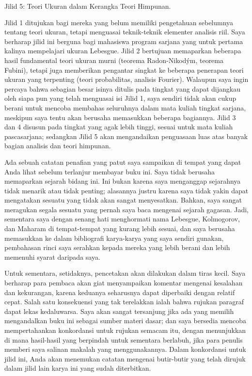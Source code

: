 \qquad\qquad Jilid 5:  Teori Ukuran dalam Kerangka Teori Himpunan.

\medskip

\noindent Jilid 1 ditujukan bagi mereka yang belum memiliki pengetahuan
sebelumnya tentang teori ukuran, tetapi menguasai teknik-teknik elementer
analisis riil.  Saya berharap jilid ini berguna bagi mahasiswa program sarjana
yang untuk pertama kalinya mempelajari ukuran Lebesgue.    Jilid 2 bertujuan
memaparkan beberapa hasil fundamental teori ukuran murni (teorema
Radon-Nikod\'ym, teorema Fubini), tetapi juga memberikan pengantar singkat
ke beberapa penerapan teori ukuran yang terpenting (teori probabilitas,
analisis Fourier).   Walaupun saya ingin percaya bahwa sebagian besar isinya
ditulis pada tingkat yang dapat dijangkau oleh siapa pun yang telah menguasai
isi Jilid 1, saya sendiri tidak akan cukup berani untuk mencoba membahas
seluruhnya dalam mata kuliah tingkat sarjana, meskipun saya tentu akan
berusaha memasukkan beberapa bagiannya.   Jilid 3 dan 4 disusun pada tingkat
yang agak lebih tinggi, sesuai untuk mata kuliah pascasarjana;  sedangkan
Jilid 5 akan mengandaikan penguasaan luas atas banyak bagian analisis dan
teori himpunan.

Ada sebuah catatan penafian yang patut saya sampaikan di tempat yang dapat
Anda lihat sebelum terlanjur membayar buku ini.   Saya tidak berusaha
memaparkan sejarah bidang ini.   Ini bukan karena saya menganggap sejarahnya
tidak menarik atau tidak penting;  alasannya justru karena saya tidak yakin
dapat mengatakan sesuatu yang tidak akan sangat menyesatkan.
Bahkan, saya sangat meragukan segala sesuatu yang pernah saya baca mengenai
sejarah gagasan.   Jadi, sementara saya dengan senang hati
menghormati nama Lebesgue, Kolmogorov, dan Maharam di tempat-tempat yang
kurang lebih sesuai, dan saya berusaha memasukkan ke dalam bibliografi
karya-karya yang saya sendiri gunakan, pembahasan rinci saya serahkan kepada
mereka yang lebih berani dan lebih memenuhi syarat daripada saya.

Untuk sementara,
setidaknya, pencetakan akan dilakukan dalam tiras kecil.   Saya berharap para
pembaca akan giat menyampaikan komentar mengenai kesalahan dan kekurangan,
karena keduanya seharusnya dapat diperbaiki dengan relatif cepat.   Salah satu
konsekuensi yang tak terelakkan ialah bahwa rujukan paragraf dapat lekas
kedaluwarsa.   Saya akan sangat tersanjung jika ada yang memilih mengandalkan
buku ini sebagai sumber materi dasar;  dan saya bersedia mencoba
mempertahankan konkordansi untuk rujukan semacam itu, dengan menunjukkan di
mana hasil-hasil yang berpindah untuk sementara berlabuh, jika para penulis
memberi saya salinan makalah yang menggunakannya.   Dalam konkordansi untuk 
jilid ini, Anda akan menemukan catatan mengenai butir-butir yang telah dirujuk
dalam jilid lain karya ini yang sudah diterbitkan.


